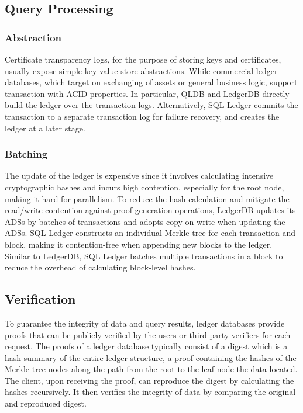 \documentclass[11pt,dvipdfm]{article}
\begin{document}
\subsection{Query Processing}

\subsubsection{Abstraction}

Certificate transparency logs, for the purpose of storing keys and certificates, usually expose simple key-value store abstractions. While commercial ledger databases, which target on exchanging of assets or general business logic, support transaction with ACID properties. In particular, QLDB and LedgerDB directly build the ledger over the transaction logs. Alternatively, SQL Ledger commits the transaction to a separate transaction log for failure recovery, and creates the ledger at a later stage.

\subsubsection{Batching}
The update of the ledger is expensive since it involves calculating intensive cryptographic hashes and incurs high contention, especially for the root node, making it hard for parallelism. 
To reduce the hash calculation and mitigate the read/write contention against proof generation operations, LedgerDB updates its ADSs by batches of transactions and adopts copy-on-write when updating the ADSs. SQL Ledger constructs an individual Merkle tree for each transaction and block, making it contention-free when appending new blocks to the ledger. Similar to LedgerDB, SQL Ledger batches multiple transactions in a block to reduce the overhead of calculating block-level hashes.

\subsection{Verification}

To guarantee the integrity of data and query results, ledger databases provide proofs that can be publicly verified by the users or third-party verifiers for each request. 
The proofs of a ledger database typically consist of a digest which is a hash summary of the entire ledger structure, a proof containing the hashes of the Merkle tree nodes along the path from the root to the leaf node the data located. 
The client, upon receiving the proof, can reproduce the digest by calculating the hashes recursively. 
It then verifies the integrity of data by comparing the original and reproduced digest.
\end{document}
